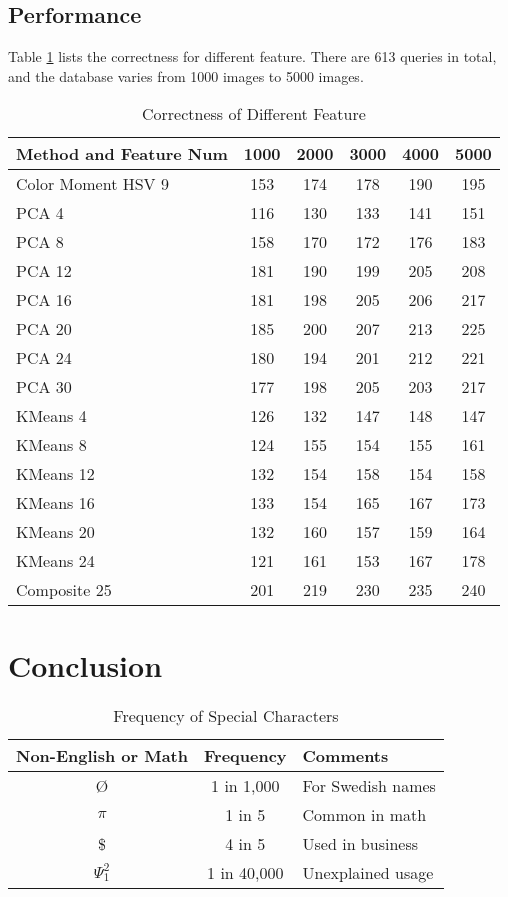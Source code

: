 \documentclass{acm_proc_article-sp}
\begin{document}
\subsection{Performance}
Table \ref{table:correctness} lists the correctness for different feature.
There are 613 queries in total, and the database varies from 1000 images
    to 5000 images.
\begin{table} \centering 
    \caption{Correctness of Different Feature}
    \label{table:correctness}
\begin{tabular}{|p{2.1cm}|c|c|c|c|c|}
    \hline
    Method and Feature Num & 1000 & 2000 & 3000 & 4000 & 5000 \\ \hline
    Color Moment HSV 9 & 153 & 174 & 178 & 190 & 195 \\ \hline
    PCA 4 & 116 & 130 & 133 & 141 & 151 \\ \hline
    PCA 8 & 158 & 170 & 172 & 176 & 183 \\ \hline
    PCA 12 & 181 & 190 & 199 & 205 & 208 \\ \hline
    PCA 16 & 181 & 198 & 205 & 206 & 217 \\ \hline
    PCA 20 & 185 & 200 & 207 & 213 & 225 \\ \hline
    PCA 24 & 180 & 194 & 201 & 212 & 221 \\ \hline
    PCA 30 & 177 & 198 & 205 & 203 & 217 \\ \hline
    KMeans 4 & 126 & 132 & 147 & 148 & 147 \\ \hline
    KMeans 8 & 124 & 155 & 154 & 155 & 161 \\ \hline
    KMeans 12 & 132 & 154 & 158 & 154 & 158 \\ \hline
    KMeans 16 & 133 & 154 & 165 & 167 & 173 \\ \hline
    KMeans 20 & 132 & 160 & 157 & 159 & 164 \\ \hline
    KMeans 24 & 121 & 161 & 153 & 167 & 178 \\ \hline
    Composite 25 & 201 & 219 & 230 & 235 & 240 \\ \hline
\end{tabular} \end{table}

\section{Conclusion}

\begin{table} 
\centering
\caption{Frequency of Special Characters}
\begin{tabular}{|c|c|l|} \hline
Non-English or Math&Frequency&Comments\\ \hline
\O & 1 in 1,000& For Swedish names\\ \hline
$\pi$ & 1 in 5& Common in math\\ \hline
\$ & 4 in 5 & Used in business\\ \hline
$\Psi^2_1$ & 1 in 40,000& Unexplained usage\\
\hline\end{tabular}
\end{table}
\end{document}
